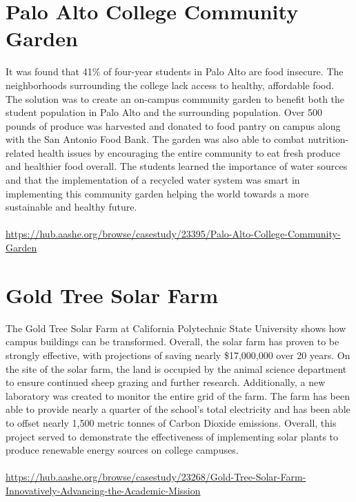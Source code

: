 \documentclass{article}
\begin{document}
\begin{spacing}{2.15}
    \section{Palo Alto College Community Garden}
    \indent It was found that 41\% of four-year students in Palo Alto are food insecure. The neighborhoods surrounding the college lack access to healthy, affordable food. The solution was to create an on-campus community garden to benefit both the student population in Palo Alto and the surrounding population. Over 500 pounds of produce was harvested and donated to food pantry on campus along with the San Antonio Food Bank. The garden was also able to combat nutrition-related health issues by encouraging the entire community to eat fresh produce and healthier food overall. The students learned the importance of water sources and that the implementation of a recycled water system was smart in implementing this community garden helping the world towards a more sustainable and healthy future. \\\\
    \url{https://hub.aashe.org/browse/casestudy/23395/Palo-Alto-College-Community-Garden}
    \newpage
    \section{Gold Tree Solar Farm}
    \indent The Gold Tree Solar Farm at California Polytechnic State University shows how campus buildings can be transformed. Overall, the solar farm has proven to be strongly effective, with projections of saving nearly \$17,000,000 over 20 years. On the site of the solar farm, the land is occupied by the animal science department to ensure continued sheep grazing and further research. Additionally, a new laboratory was created to monitor the entire grid of the farm. The farm has been able to provide nearly a quarter of the school's total electricity and has been able to offset nearly 1,500 metric tonnes of Carbon Dioxide emissions. Overall, this project served to demonstrate the effectiveness of implementing solar plants to produce renewable energy sources on college campuses. \\\\ 
    \url{https://hub.aashe.org/browse/casestudy/23268/Gold-Tree-Solar-Farm-Innovatively-Advancing-the-Academic-Mission}

\end{spacing}
\end{document}
